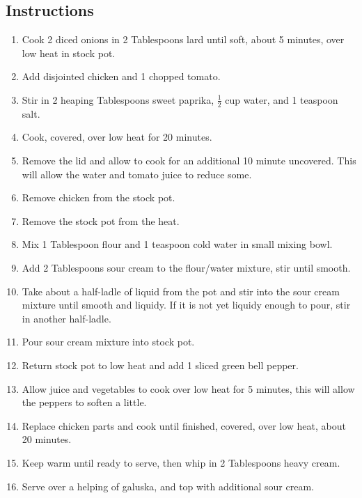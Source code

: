 \begin{multicols}{2}
\subsection*{Instructions}
\begin{enumerate}
    \item Cook 2 diced onions in 2 Tablespoons lard until soft, about 5 minutes, over low heat in stock pot.
    \item Add disjointed chicken and 1 chopped tomato.
    \item Stir in 2 heaping Tablespoons sweet paprika, \( \frac{1}{2} \) cup water, and 1 teaspoon salt.
    \item Cook, covered, over low heat for 20 minutes.
    \item Remove the lid and allow to cook for an additional 10 minute uncovered. This will allow the water and tomato juice to reduce some.
    \item Remove chicken from the stock pot.
    \item Remove the stock pot from the heat.
    \item Mix 1 Tablespoon flour and 1 teaspoon cold water in small mixing bowl.
    \item Add 2 Tablespoons sour cream to the flour/water mixture, stir until smooth.
    \item Take about a half-ladle of liquid from the pot and stir into the sour cream mixture until smooth and liquidy. If it is not yet liquidy enough to pour, stir in another half-ladle.
    \item Pour sour cream mixture into stock pot.
    \item Return stock pot to low heat and add 1 sliced green bell pepper.
    \item Allow juice and vegetables to cook over low heat for 5 minutes, this will allow the peppers to soften a little.
    \item Replace chicken parts and cook until finished, covered, over low heat, about 20 minutes.
    \item Keep warm until ready to serve, then whip in 2 Tablespoons heavy cream.
    \item Serve over a helping of galuska, and top with additional sour cream.

\end{enumerate}


\end{multicols}
